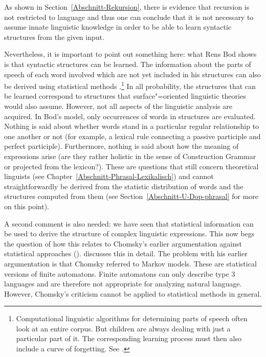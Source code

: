 As shown in Section~\ref{Abschnitt-Rekursion}, there is evidence that recursion is not restricted to language and thus one can conclude that it is not 
necessary to assume innate linguistic knowledge in order to be able to learn syntactic structures from the given input.

Nevertheless, it is important to point out something here: what Rens Bod shows is that syntactic structures can be learned.
The information about the parts of speech of each word involved which are not yet included in his structures can also be derived using
statistical methods \citep{RCF98a,Clark2000a}.\footnote{
	Computational linguistic algorithms for determining parts of speech often look at an entire corpus. But children are always
	dealing with just a particular part of it. The corresponding learning process must then also include a
	curve of forgetting. See . 
} 
In all probability, the structures that can be learned correspond to structures that surface"=oriented linguistic theories would also assume. However, not
all aspects of the linguistic analysis are acquired. In Bod's model, only occurrences of words in structures are evaluated.
Nothing is said about whether words stand in a particular regular relationship to one another or not (for example, a lexical rule connecting a passive
participle and perfect participle). Furthermore, nothing is said about how the meaning of expressions arise (are they rather  holistic in the sense of Construction
Grammar or projected from the lexicon?). These are questions that still concern theoretical linguists (see Chapter~\ref{Abschnitt-Phrasal-Lexikalisch}) 
and cannot straightforwardly be derived from the statistic distribution of words and the structures computed from them (see Section~\ref{Abschnitt-U-Dop-phrasal}
for more on this point).

A second comment is also needed: we have seen that statistical information can be used to derive the structure of complex linguistic expressions. This now
begs the question of how this relates to Chomsky's earlier argumentation against statistical approaches
(\citealp[]{Chomsky57a}). \citet[Section~4.2]{Abney96a} discusses this in detail. The problem with his earlier argumentation is that Chomsky referred
 to Markov models. These are statistical versions of finite automatons. Finite automatons can only describe
type 3 languages and are therefore not appropriate for analyzing natural
language. However, Chomsky's criticism cannot be applied to statistical methods
in general.

